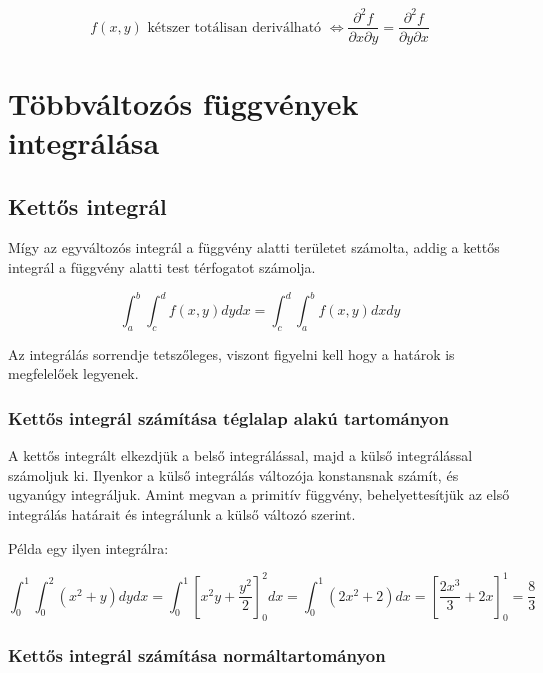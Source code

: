 \documentclass{article}
\begin{document}
\begin{equation*}
    f(x,y) \text{ kétszer totálisan deriválható } \Leftrightarrow \frac{\partial^2 f}{\partial x \partial y} = \frac{\partial^2 f}{\partial y \partial x}
\end{equation*}


\newpage

\section{Többváltozós függvények integrálása}

\subsection{Kettős integrál}

Mígy az egyváltozós integrál a függvény alatti területet számolta, addig a kettős integrál a függvény alatti test térfogatot számolja.

\begin{equation*}
    \int_{a}^{b} \int_{c}^{d} f(x,y) dy dx = \int_{c}^{d} \int_{a}^{b} f(x,y) dx dy
\end{equation*}

Az integrálás sorrendje tetszőleges, viszont figyelni kell hogy a határok is megfelelőek legyenek.

\subsubsection{Kettős integrál számítása téglalap alakú tartományon}

A kettős integrált elkezdjük a belső integrálással, majd a kül\-ső in\-teg\-rá\-lás\-sal számoljuk ki.
Ilyenkor a külső integrálás változója konstansnak számít, és ugyanúgy integráljuk. Amint megvan a primitív függvény, behelyettesítjük az első integrálás határait
és integrálunk a külső változó szerint.

Példa egy ilyen integrálra:

\begin{equation*}
    \int_{0}^{1} \int_{0}^{2} (x^2 + y) dy dx = \int_{0}^{1} \left[ x^2y + \frac{y^2}{2} \right]_{0}^{2} dx = \int_{0}^{1} (2x^2 + 2) dx = \left[ \frac{2x^3}{3} + 2x \right]_{0}^{1} = \frac{8}{3}
\end{equation*}

\subsubsection{Kettős integrál számítása normáltartományon}
\end{document}
